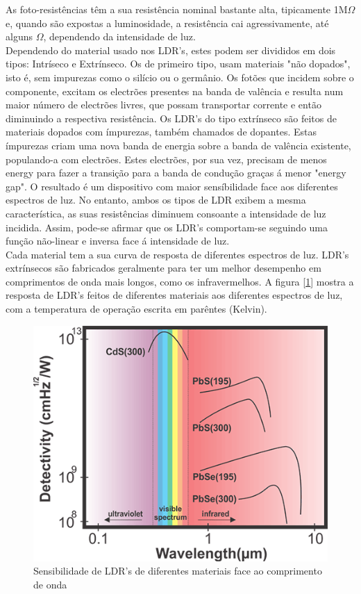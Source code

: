 \documentclass[12pt]{article}
\begin{document}
As foto-resistências têm a sua resistência nominal bastante alta, tipicamente 1M$\Omega$ e, quando são expostas a luminosidade, a resistência cai agressivamente, até alguns $\Omega$, dependendo da intensidade de luz.\\
Dependendo do material usado nos LDR's, estes podem ser divididos em dois tipos: Intríseco e Extrínseco. Os de primeiro tipo, usam materiais "não dopados", isto é, sem impurezas como o silício ou o germânio. Os fotões que incidem sobre o componente, excitam os electrões presentes na banda de valência e resulta num maior número de electrões livres, que possam transportar corrente e então diminuindo a respectiva resistência. Os LDR's do tipo extrínseco são feitos de materiais dopados com ímpurezas, também chamados de dopantes. Estas ímpurezas criam uma nova banda de energia sobre a banda de valência existente, populando-a com electrões. Estes electrões, por sua vez, precisam de menos energy para fazer a transição para a banda de condução graças á menor "energy gap". O resultado é um dispositivo com maior sensíbilidade face aos diferentes espectros de luz. No entanto, ambos os tipos de LDR exibem a mesma característica, as suas resistências diminuem consoante a intensidade de luz incidida. Assim, pode-se afirmar que os LDR's comportam-se seguindo uma função não-linear e inversa face á intensidade de luz.\\
Cada material tem a sua curva de resposta de diferentes espectros de luz. LDR's extrínsecos são fabricados geralmente para ter um melhor desempenho em comprimentos de onda mais longos, como os infravermelhos. A figura [\ref{fig:wavelenght}] mostra a resposta de LDR's feitos de diferentes materiais aos diferentes espectros de luz, com a temperatura de operação escrita em parêntes (Kelvin).

\begin{figure}[H]
        \centering
        \includegraphics[width=0.6\linewidth]{imgs/wavelength-detectivity.png}
        \caption{Sensibilidade de LDR's de diferentes materiais face ao comprimento de onda}
        \label{fig:wavelenght}
    \end{figure}
\end{document}
